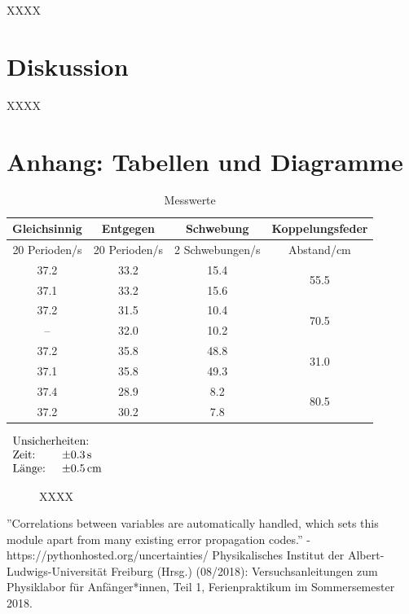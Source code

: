 \documentclass[11pt,a4paper]{article}
\begin{document}
XXXX

\section{Diskussion}

XXXX

\pagebreak

\section{Anhang: Tabellen und Diagramme}

\begin{table}[h]
\centering
\caption{Messwerte} \vspace{11pt}

\begin{tabular}{cccc}
\textrm{Gleichsinnig} & \textrm{Entgegen} & \textrm{Schwebung} & \textrm{Koppelungsfeder}\\
\toprule
\textrm{20 Perioden}/\textrm{s} & \textrm{20 Perioden}/\textrm{s} & \textrm{2 Schwebungen}/\textrm{s} & \textrm{Abstand}/\textrm{cm}\\
\midrule 
37.2 & 33.2 & 15.4 & \multirow{2}{*}{55.5}\\
37.1 & 33.2 & 15.6 &\\
\hline 
37.2 & 31.5 & 10.4 & \multirow{2}{*}{70.5}\\
 --  & 32.0 & 10.2 &\\
\hline 
37.2 & 35.8 & 48.8 & \multirow{2}{*}{31.0}\\ 
37.1 & 35.8 & 49.3 &\\ 
\hline
37.4 & 28.9 & \phantom{0}8.2 & \multirow{2}{*}{80.5}\\
37.2 & 30.2 & \phantom{0}7.8 &\\ 
\bottomrule
\end{tabular}
$\begin{array}{ll}
\multicolumn{2}{l}{\textrm{Unsicherheiten:}}\\
\textrm{Zeit: } & \pm 0.3\, \textrm{s}\\
\textrm{Länge: } & \pm 0.5\, \textrm{cm}\\
\end{array}$
\label{Tab:1}
\end{table}

\begin{figure}[p]
\centering
\renewcommand\thefigure{BX}
\caption[XXXX]{XXXX}
\label{Abb:X}
\end{figure}

\begin{thebibliography}{9}
''Correlations between variables are automatically handled, which sets this module apart from many existing error propagation codes.'' - https://pythonhosted.org/uncertainties/
 Physikalisches Institut der Albert-Ludwigs-Universität Freiburg (Hrsg.) (08/2018): Versuchsanleitungen zum Physiklabor für Anfänger*innen, Teil 1, Ferienpraktikum im Sommersemester 2018.
\end{thebibliography}
\end{document}
